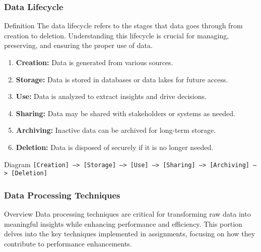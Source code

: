 \documentclass[aspectratio=169]{beamer}
\begin{document}
\begin{frame}
    \frametitle{Data Lifecycle}
    \begin{block}{Definition}
        The data lifecycle refers to the stages that data goes through from creation to deletion.
        Understanding this lifecycle is crucial for managing, preserving, and ensuring the proper use of data.
    \end{block}
    
    \begin{enumerate}
        \item \textbf{Creation:} Data is generated from various sources.
        \item \textbf{Storage:} Data is stored in databases or data lakes for future access.
        \item \textbf{Use:} Data is analyzed to extract insights and drive decisions.
        \item \textbf{Sharing:} Data may be shared with stakeholders or systems as needed.
        \item \textbf{Archiving:} Inactive data can be archived for long-term storage.
        \item \textbf{Deletion:} Data is disposed of securely if it is no longer needed.
    \end{enumerate}
    
    \begin{block}{Diagram}
        \texttt{[Creation] --> [Storage] --> [Use] --> [Sharing] --> [Archiving] --> [Deletion]}
    \end{block}
\end{frame}

\begin{frame}[fragile]
    \frametitle{Data Processing Techniques}
    \begin{block}{Overview}
        Data processing techniques are critical for transforming raw data into meaningful insights while enhancing performance and efficiency. This portion delves into the key techniques implemented in assignments, focusing on how they contribute to performance enhancements.
    \end{block}
\end{frame}
\end{document}
